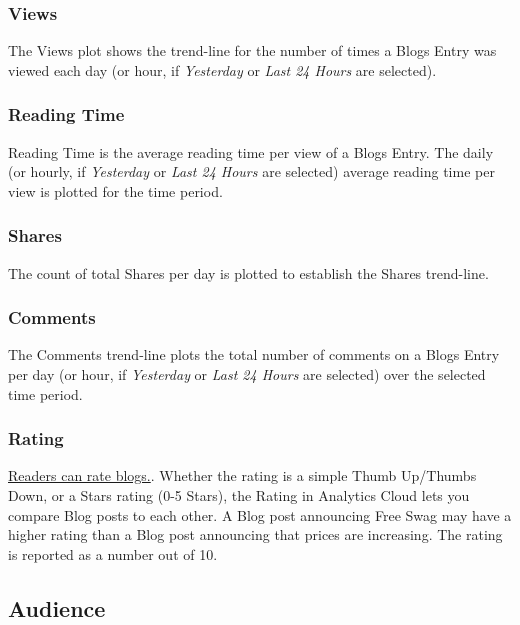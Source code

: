 \subsubsection{Views}\label{views-1}

The Views plot shows the trend-line for the number of times a Blogs
Entry was viewed each day (or hour, if \emph{Yesterday} or \emph{Last 24
Hours} are selected).

\subsubsection{Reading Time}\label{reading-time}

Reading Time is the average reading time per view of a Blogs Entry. The
daily (or hourly, if \emph{Yesterday} or \emph{Last 24 Hours} are
selected) average reading time per view is plotted for the time period.

\subsubsection{Shares}\label{shares}

The count of total Shares per day is plotted to establish the Shares
trend-line.

\subsubsection{Comments}\label{comments}

The Comments trend-line plots the total number of comments on a Blogs
Entry per day (or hour, if \emph{Yesterday} or \emph{Last 24 Hours} are
selected) over the selected time period.

\subsubsection{Rating}\label{rating}

\href{/docs/7-1/user/-/knowledge_base/u/displaying-blogs}{Readers can
rate blogs.}. Whether the rating is a simple Thumb Up/Thumbs Down, or a
Stars rating (0-5 Stars), the Rating in Analytics Cloud lets you compare
Blog posts to each other. A Blog post announcing Free Swag may have a
higher rating than a Blog post announcing that prices are increasing.
The rating is reported as a number out of 10.

\subsection{Audience}\label{audience-2}

